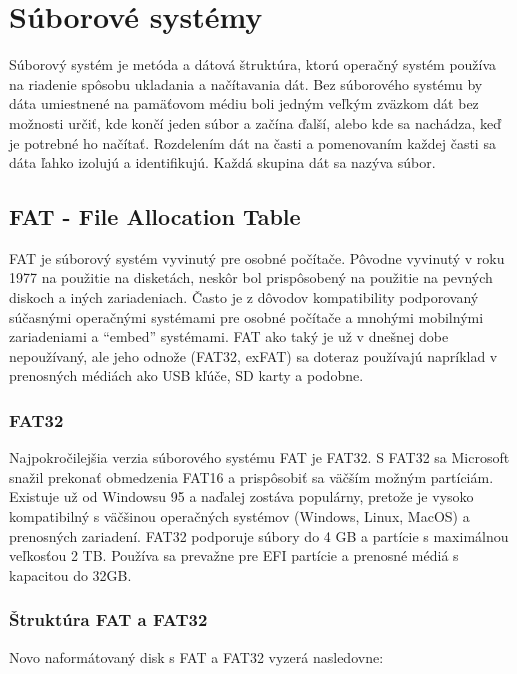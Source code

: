 \documentclass[12pt,oneside,slovak,a4paper]{article}
\begin{document}

\section{Súborové systémy}
Súborový systém je metóda a dátová štruktúra, ktorú operačný systém používa na riadenie spôsobu ukladania a načítavania dát. Bez súborového systému by dáta umiestnené na pamäťovom médiu boli jedným veľkým zväzkom dát bez možnosti určiť, kde končí jeden súbor a začína ďalší, alebo kde sa nachádza, keď je potrebné ho načítať. Rozdelením dát na časti a pomenovaním každej časti sa dáta ľahko izolujú a identifikujú. Každá skupina dát sa nazýva súbor.

\subsection{FAT - File Allocation Table}
FAT je súborový systém vyvinutý pre osobné počítače. Pôvodne vyvinutý v roku 1977 na použitie na disketách, neskôr bol prispôsobený na použitie na pevných diskoch a iných zariadeniach. Často je z dôvodov kompatibility podporovaný súčasnými operačnými systémami pre osobné počítače a mnohými mobilnými zariadeniami a ``embed'' systémami. FAT ako taký je už v dnešnej dobe nepoužívaný, ale jeho odnože (FAT32, exFAT) sa doteraz používajú napríklad v prenosných médiách ako USB kľúče, SD karty a podobne.

\subsubsection{FAT32}
Najpokročilejšia verzia súborového systému FAT je FAT32. S FAT32 sa Microsoft snažil prekonať obmedzenia FAT16 a prispôsobiť sa väčším možným partíciám. Existuje už od Windowsu 95 a naďalej zostáva populárny, pretože je vysoko kompatibilný s väčšinou operačných systémov (Windows, Linux, MacOS) a prenosných zariadení. FAT32 podporuje súbory do 4 GB a partície s maximálnou veľkosťou 2 TB. Používa sa prevažne pre EFI partície a prenosné médiá s kapacitou do 32GB.

\subsubsection{Štruktúra FAT a FAT32}
Novo naformátovaný disk s FAT a FAT32 vyzerá nasledovne:
\end{document}
